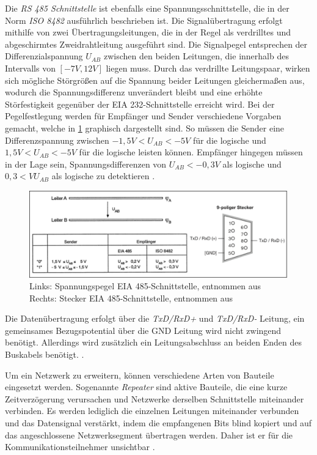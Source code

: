 Die \textit{RS 485 Schnittstelle} ist ebenfalls eine Spannungsschnittstelle, die in der Norm \textit{ISO 8482} ausführlich beschrieben ist. Die Signalübertragung erfolgt mithilfe von zwei Übertragungsleitungen, die in der Regel als verdrilltes und abgeschirmtes Zweidrahtleitung ausgeführt sind. Die Signalpegel entsprechen der Differenzialspannung $U_{AB}$ zwischen den beiden Leitungen, die innerhalb des Intervalls von $[-7V,12V]$ liegen muss. Durch das verdrillte Leitungspaar, wirken sich mögliche Störgrößen auf die Spannung beider Leitungen gleichermaßen aus, wodurch die Spannungsdifferenz unverändert bleibt und eine erhöhte Störfestigkeit gegenüber der EIA 232-Schnittstelle erreicht wird.
Bei der Pegelfestlegung werden für Empfänger und Sender verschiedene Vorgaben gemacht, welche in \ref{fig:rs485} graphisch dargestellt sind. So müssen die Sender eine Differenzspannung zwischen $-1,5V<U_{AB}<-5V$ für die logische \Gob und $1,5V<U_{AB}<-5V$ für die logische \Gob leisten können. Empfänger hingegen müssen in der Lage sein, Spannungsdifferenzen von $U_{AB}<-0,3V$ als logische \Gob und $0,3<VU_{AB}$ als logische \Gob zu detektieren \cite[S.~59ff.]{schn06}.

\begin{figure}
\centering
\includegraphics[width=\textwidth]{abbildungen/20160314_rs485}
\caption[Spannungspegel und Stecker der EIA 485-Schnittstelle]{Links: Spannungspegel EIA 485-Schnittstelle, entnommen aus \cite[S.~60]{schn06} \newline Rechts: Stecker EIA 485-Schnittstelle, entnommen aus \cite[S.~19]{sch08}}
\label{fig:rs485}
\end{figure}

Die Datenübertragung erfolgt über die \textit{TxD/RxD+} und \textit{TxD/RxD-} Leitung, ein gemeinsames Bezugspotential über die GND Leitung wird nicht zwingend benötigt. Allerdings wird zusätzlich ein Leitungsabschluss an beiden Enden des Buskabels benötigt.  \cite[S.~19f.]{sch08}.

Um ein Netzwerk zu erweitern, können verschiedene Arten von Bauteile eingesetzt werden. Sogenannte \textit{Repeater} sind aktive Bauteile, die eine kurze Zeitverzögerung verursachen und Netzwerke derselben Schnittstelle miteinander verbinden. Es werden lediglich die einzelnen Leitungen miteinander verbunden und das Datensignal verstärkt, indem die empfangenen Bits blind kopiert und auf das angeschlossene Netzwerksegment übertragen werden. Daher ist er für die Kommunikationsteilnehmer unsichtbar \cite[S.~79f.]{schn06}.

